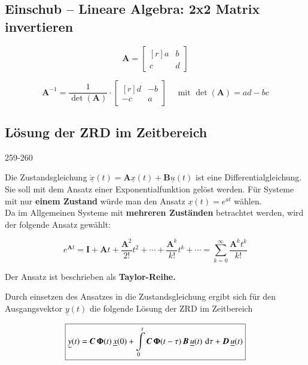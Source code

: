 \subsection{Einschub -- Lineare Algebra: 2x2 Matrix invertieren}

\begin{minipage}[b]{0.33\columnwidth}
    $$ \bm{A} = 
    \begin{bmatrix*}[r]
        a & b \\
        c & d 
    \end{bmatrix*} $$
\end{minipage}
\hfill
\begin{minipage}[b]{0.66\columnwidth}
    $$ \bm{A}^{-1} = \frac{1}{\det(\bm{A})} \cdot 
    \begin{bmatrix*}[r]
        d & -b \\
        -c & a 
    \end{bmatrix*} \quad \text{ mit } \det(\bm{A}) = ad - bc $$
\end{minipage}

\subsection{Lösung der ZRD im Zeitbereich}{259-260}
\label{ZRD Lösung Zeitbereich}

Die Zustandsgleichung $\underline{\dot{x}}(t) = \bm{A} \underline{x}(t) + \bm{B} \underline{u}(t)$ ist eine Differentialgleichung.
Sie soll mit dem Ansatz einer Exponentialfunktion gelöst werden. Für Systeme mit nur \textbf{einem Zustand} würde man den Ansatz 
$\underline{x}(t) = e^{at}$ wählen. \\
Da im Allgemeinen Systeme mit \textbf{mehreren Zuständen} betrachtet werden, wird der folgende Ansatz gewählt:

$$ e^{\bm{A} t} = \bm{I} + \bm{A} t + \frac{\bm{A}^2}{2!} t^2 + \cdots + \frac{\bm{A}^k}{k!} t^k + \cdots 
    = \sum\limits_{k=0}^{\infty} \frac{\bm{A}^k t^k}{k!} $$

Der Ansatz ist beschrieben als \textbf{Taylor-Reihe.}

Durch einsetzen des Ansatzes in die Zustandsgleichung ergibt sich für den Ausgangsvektor $\underline{y}(t)$ die folgende Lösung
der ZRD im Zeitbereich

$$ \boxed{ \underline{y}(t) = \bm{C} \, \bm{\Phi}(t) \, \underline{x}(0) + 
    \int\limits_0^t \bm{C} \, \bm{\Phi}(t - \tau) \, \bm{B} \, \underline{u}(t) \, \mathop{} \! \mathrm{d} \tau + \bm{D} \, \underline{u}(t) } $$

